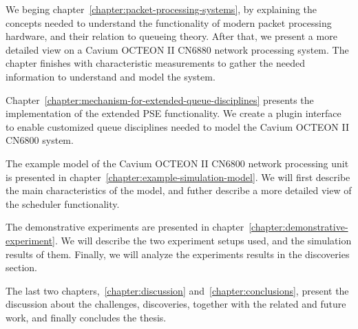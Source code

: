 We beging chapter~\ref{chapter:packet-processing-systems}, by explaining the concepts needed to understand the functionality of modern packet processing hardware, and their relation to queueing theory. After that, we present a  more detailed view on a Cavium OCTEON II CN6880 network processing system. The chapter finishes with characteristic measurements to gather the needed information to understand and model the system.

Chapter~\ref{chapter:mechanism-for-extended-queue-disciplines} presents the implementation of the extended PSE functionality. We create a plugin interface to enable customized queue disciplines needed to model the Cavium OCTEON II CN6800 system.

The example model of the Cavium OCTEON II CN6800 network processing unit is presented in chapter~\ref{chapter:example-simulation-model}. We will first describe the main characteristics of the model, and futher describe a more detailed view of the scheduler functionality.

The demonstrative experiments are presented in chapter~\ref{chapter:demonstrative-experiment}. We will describe the two experiment setups used, and the simulation results of them. Finally, we will analyze the experiments results in the discoveries section.

The last two chapters,~\ref{chapter:discussion} and~\ref{chapter:conclusions}, present the discussion about the challenges, discoveries, together with the related and future work, and finally concludes the thesis.

